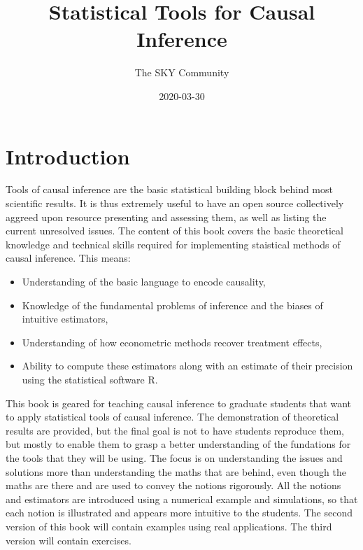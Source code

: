 \documentclass[]{book}
\title{Statistical Tools for Causal Inference}
\author{The SKY Community}
\date{2020-03-30}
\providecommand{\tightlist}{%
  \setlength{\itemsep}{0pt}\setlength{\parskip}{0pt}}
\theoremstyle{definition}
\theoremstyle{definition}
\theoremstyle{definition}
\theoremstyle{remark}
\begin{document}
\maketitle

{
\setcounter{tocdepth}{0}
\tableofcontents
}
\hypertarget{introduction}{%
\chapter*{Introduction}\label{introduction}}

Tools of causal inference are the basic statistical building block behind most scientific results.
It is thus extremely useful to have an open source collectively aggreed upon resource presenting and assessing them, as well as listing the current unresolved issues.
The content of this book covers the basic theoretical knowledge and technical skills required for implementing staistical methods of causal inference.
This means:

\begin{itemize}
\tightlist
\item
  Understanding of the basic language to encode causality,
\item
  Knowledge of the fundamental problems of inference and the biases of intuitive estimators,
\item
  Understanding of how econometric methods recover treatment effects,
\item
  Ability to compute these estimators along with an estimate of their precision using the statistical software R.
\end{itemize}

This book is geared for teaching causal inference to graduate students that want to apply statistical tools of causal inference.
The demonstration of theoretical results are provided, but the final goal is not to have students reproduce them, but mostly to enable them to grasp a better understanding of the fundations for the tools that they will be using.
The focus is on understanding the issues and solutions more than understanding the maths that are behind, even though the maths are there and are used to convey the notions rigorously.
All the notions and estimators are introduced using a numerical example and simulations, so that each notion is illustrated and appears more intuitive to the students.
The second version of this book will contain examples using real applications.
The third version will contain exercises.
\end{document}
